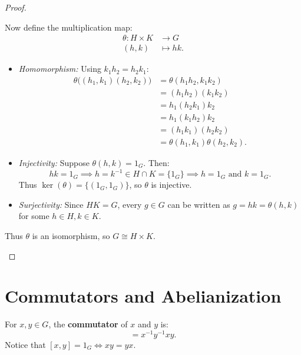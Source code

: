 \begin{proof}
\begin{itemize}[leftmargin=1.5em, itemsep=6pt]
    Now define the multiplication map:
    \begin{align*}
    \theta: H \times K &\longrightarrow G \\
    (h, k) &\longmapsto hk.
    \end{align*}
    \begin{itemize}[leftmargin=1.5em, itemsep=4pt]
        \item \emph{Homomorphism:} Using $k_1 h_2 = h_2 k_1$:
        \begin{align*}
        \theta\bigl((h_1, k_1)(h_2, k_2)\bigr) &= \theta(h_1 h_2, k_1 k_2) \\
        &= (h_1 h_2)(k_1 k_2) \\
        &= h_1 (h_2 k_1) k_2 \\
        &= h_1 (k_1 h_2) k_2 \\
        &= (h_1 k_1)(h_2 k_2) \\
        &= \theta(h_1, k_1)\theta(h_2, k_2).
        \end{align*}
        \item \emph{Injectivity:} Suppose $\theta(h, k) = 1_G$. Then:
        \begin{equation*}
        hk = 1_G \implies h = k^{-1} \in H \cap K = \{ 1_G \} \implies h = 1_G \text{ and } k = 1_G.
        \end{equation*}
        Thus $\ker(\theta) = \{ (1_G, 1_G) \}$, so $\theta$ is injective.
        \item \emph{Surjectivity:} Since $HK = G$, every $g \in G$ can be written as $g = hk = \theta(h, k)$ for some $h \in H, k \in K$.
    \end{itemize}
    Thus $\theta$ is an isomorphism, so $G \cong H \times K$.
\end{itemize}
\end{proof}

\section{Commutators and Abelianization}
\label{sec:commutator_abelianization}

\begin{definition}[Commutator]
For $x, y \in G$, the \textbf{commutator} of $x$ and $y$ is:
\begin{equation}
[x, y] = x^{-1} y^{-1} x y.
\end{equation}
Notice that $[x, y] = 1_G \iff xy = yx$.
\end{definition}

